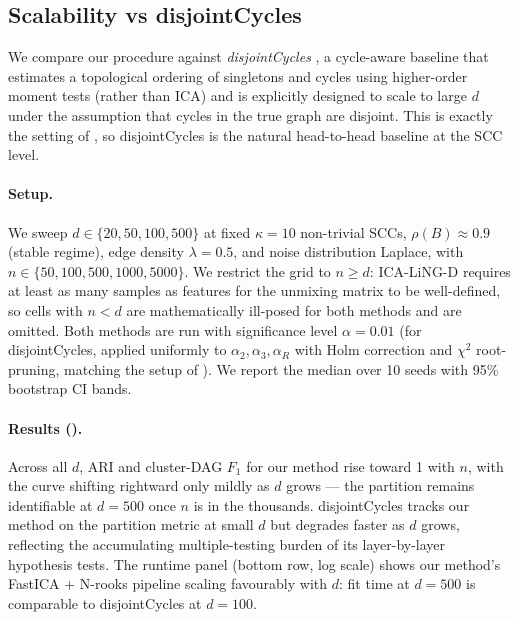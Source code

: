 \documentclass{article}
\begin{document}
\subsection{Scalability vs disjointCycles}
\label{sec:scalability}

We compare our procedure against \emph{disjointCycles} \citep{drton2024disjointcycles}, a cycle-aware baseline that estimates a topological ordering of singletons and cycles using higher-order moment tests (rather than ICA) and is explicitly designed to scale to large $d$ under the assumption that cycles in the true graph are disjoint. This is exactly the setting of , so disjointCycles is the natural head-to-head baseline at the SCC level.

\paragraph{Setup.} We sweep $d \in \{20, 50, 100, 500\}$ at fixed $\kappa = 10$ non-trivial SCCs, $\rho(B) \approx 0.9$ (stable regime), edge density $\lambda = 0.5$, and noise distribution Laplace, with $n \in \{50, 100, 500, 1000, 5000\}$. We restrict the grid to $n \geq d$: ICA-LiNG-D requires at least as many samples as features for the unmixing matrix to be well-defined, so cells with $n < d$ are mathematically ill-posed for both methods and are omitted. Both methods are run with significance level $\alpha = 0.01$ (for disjointCycles, applied uniformly to $\alpha_2, \alpha_3, \alpha_R$ with Holm correction and $\chi^2$ root-pruning, matching the setup of \citealt{drton2024disjointcycles}). We report the median over 10 seeds with 95\% bootstrap CI bands.

\paragraph{Results ().} Across all $d$, ARI and cluster-DAG $F_1$ for our method rise toward 1 with $n$, with the curve shifting rightward only mildly as $d$ grows --- the partition remains identifiable at $d = 500$ once $n$ is in the thousands. disjointCycles tracks our method on the partition metric at small $d$ but degrades faster as $d$ grows, reflecting the accumulating multiple-testing burden of its layer-by-layer hypothesis tests. The runtime panel (bottom row, log scale) shows our method's FastICA + N-rooks pipeline scaling favourably with $d$: fit time at $d = 500$ is comparable to disjointCycles at $d = 100$.
\end{document}
